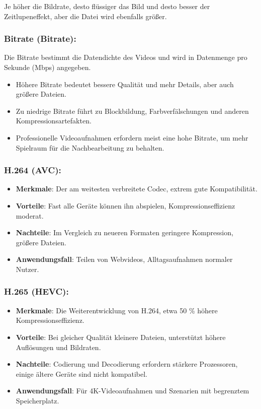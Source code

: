 Je höher die Bildrate, desto flüssiger das Bild und desto besser der Zeitlupeneffekt, aber die Datei wird ebenfalls größer.

\subsubsection*{Bitrate (Bitrate):}

Die Bitrate bestimmt die Datendichte des Videos und wird in Datenmenge pro Sekunde (Mbps) angegeben.

\begin{itemize}
  \item Höhere Bitrate bedeutet bessere Qualität und mehr Details, aber auch größere Dateien.
  \item Zu niedrige Bitrate führt zu Blockbildung, Farbverfälschungen und anderen Kompressionsartefakten.
  \item Professionelle Videoaufnahmen erfordern meist eine hohe Bitrate, um mehr Spielraum für die Nachbearbeitung zu behalten.
\end{itemize}


\subsubsection*{H.264 (AVC):}

\begin{itemize}
  \item \textbf{Merkmale}: Der am weitesten verbreitete Codec, extrem gute Kompatibilität.
  \item \textbf{Vorteile}: Fast alle Geräte können ihn abspielen, Kompressionseffizienz moderat.
  \item \textbf{Nachteile}: Im Vergleich zu neueren Formaten geringere Kompression, größere Dateien.
  \item \textbf{Anwendungsfall}: Teilen von Webvideos, Alltagsaufnahmen normaler Nutzer.
\end{itemize}

\subsubsection*{H.265 (HEVC):}

\begin{itemize}
  \item \textbf{Merkmale}: Die Weiterentwicklung von H.264, etwa 50 \% höhere Kompressionseffizienz.
  \item \textbf{Vorteile}: Bei gleicher Qualität kleinere Dateien, unterstützt höhere Auflösungen und Bildraten.
  \item \textbf{Nachteile}: Codierung und Decodierung erfordern stärkere Prozessoren, einige ältere Geräte sind nicht kompatibel.
  \item \textbf{Anwendungsfall}: Für 4K-Videoaufnahmen und Szenarien mit begrenztem Speicherplatz.
\end{itemize}

